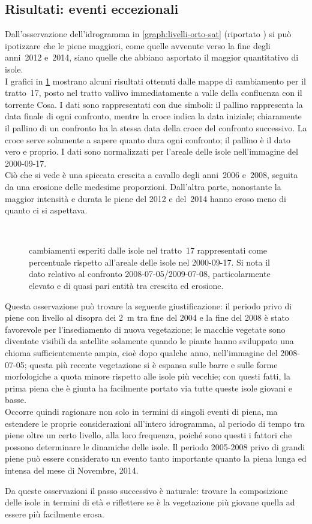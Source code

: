 \subsection{Risultati: eventi eccezionali}
\label{sec:camb-ris}
Dall'osservazione dell'idrogramma in \cref{graph:livelli-orto-sat} (riportato ) si può ipotizzare che le piene maggiori, come quelle avvenute verso la fine degli anni~2012 e~2014, siano quelle che abbiano asportato il maggior quantitativo di isole.
\\
I grafici in \cref{graph:tr-17-camb} mostrano alcuni risultati ottenuti dalle mappe di cambiamento per il tratto~17, posto nel tratto vallivo immediatamente a valle della confluenza con il torrente Cosa.
I dati sono rappresentati con due simboli: il pallino rappresenta la data finale di ogni confronto, mentre la croce indica la data iniziale; 
chiaramente il pallino di un confronto ha la stessa data della croce del confronto successivo. 
La croce serve solamente a sapere quanto dura ogni confronto; il pallino è il dato vero e proprio.
I dati sono normalizzati per l'areale delle isole nell'immagine \AST{} del 2000-09-17.
\\
Ciò che si vede è una spiccata crescita a cavallo degli anni~2006 e~2008, seguita da una erosione delle medesime proporzioni.
Dall'altra parte, nonostante la maggior intensità e durata le piene del 2012 e del~2014 hanno eroso meno di quanto ci si aspettava.
%
\begin{figure}
	\centering
	
	\\
	
	\caption[cambiamenti esperiti dalle isole nel tratto~17]{cambiamenti esperiti dalle isole nel tratto~17 rappresentati come percentuale rispetto all'areale delle isole nel 2000-09-17. 
	Si nota il dato relativo al confronto 2008-07-05/2009-07-08, particolarmente elevato e di quasi pari entità tra crescita ed erosione.}
	\label{graph:tr-17-camb}
\end{figure}
%
Questa osservazione può trovare la seguente giustificazione: il periodo privo di piene con livello al disopra dei \SI{2}{\m} tra fine del 2004 e la fine del 2008 è stato favorevole per l'insediamento di nuova vegetazione;
le macchie vegetate sono diventate visibili da satellite solamente quando le piante hanno sviluppato una chioma sufficientemente ampia, cioè dopo qualche anno, nell'immagine del 2008-07-05;
questa più recente vegetazione si è espansa sulle barre e sulle forme morfologiche a quota minore rispetto alle isole più vecchie;
con questi fatti, la prima piena che è giunta ha facilmente portato via tutte queste isole giovani e basse.
\\
Occorre quindi ragionare non solo in termini di singoli eventi di piena, ma estendere le proprie considerazioni all'intero idrogramma, al periodo di tempo tra piene oltre un certo livello, alla loro frequenza, poiché sono questi i fattori che possono determinare le dinamiche delle isole.
Il periodo 2005-2008 privo di grandi piene può essere considerato un evento tanto importante quanto la piena lunga ed intensa del mese di Novembre, 2014.



Da queste osservazioni il passo successivo è naturale: trovare la composizione delle isole in termini di età e riflettere se è la vegetazione più giovane quella ad essere più facilmente erosa.


